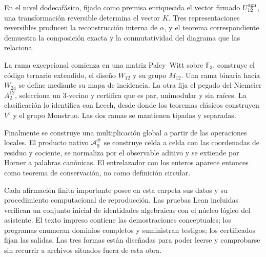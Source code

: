 En el nivel dodecafásico, fijado como premisa enriquecida el vector firmado
\(U_{12}^{\rm sgn}\), una transformación reversible determina el vector
\(K\). Tres representaciones reversibles producen la reconstrucción
interna de \(\alpha\), y el teorema correspondiente demuestra la composición
exacta y la conmutatividad del diagrama que las relaciona.

La rama excepcional comienza en una matriz Paley--Witt sobre
\(\mathbb F_3\), construye el código ternario extendido, el diseño
\(W_{12}\) y su grupo \(M_{12}\). Una rama binaria hacia \(W_{24}\) se
define mediante su mapa de incidencia. La otra fija el pegado del Niemeier
\(A_2^{12}\), selecciona un 3-vecino y certifica que es par, unimodular y sin
raíces. La clasificación lo identifica con Leech, desde donde los teoremas
clásicos construyen \(V^\natural\) y el grupo Monstruo. Las dos ramas se
mantienen tipadas y separadas.

Finalmente se construye una multiplicación global a partir de las operaciones
locales. El producto nativo
\(\mathcal A_9^\#\) se construye celda a celda con las coordenadas de residuo y
cociente, se normaliza por el observable aditivo y se extiende por Horner a palabras
canónicas. El entrelazador con los enteros aparece entonces como teorema de
conservación, no como definición circular.

Cada afirmación finita importante posee en esta carpeta sus datos y su
procedimiento computacional de reproducción. Las pruebas Lean incluidas verifican un conjunto
inicial de identidades algebraicas con el núcleo lógico del asistente. El
texto impreso contiene las demostraciones conceptuales; los programas
enumeran dominios completos y suministran testigos; los certificados fijan
las salidas. Las tres formas están diseñadas para poder leerse y comprobarse
sin recurrir a archivos situados fuera de esta obra.
